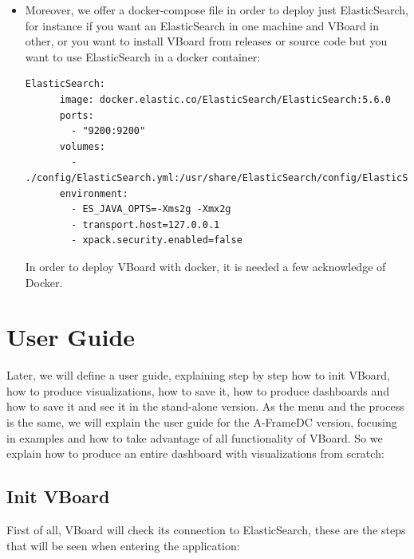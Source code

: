 \documentclass[a4paper, 12pt]{book}
\begin{document}
\begin{itemize}
    \item Moreover, we offer a docker-compose file in order to deploy just ElasticSearch, for instance if you want an ElasticSearch in one machine and VBoard in other, or you want to install VBoard from releases or source code but you want to use ElasticSearch in a docker container:
    \begin{lstlisting}[frame=single]
    ElasticSearch:
      image: docker.elastic.co/ElasticSearch/ElasticSearch:5.6.0
      ports:
        - "9200:9200"
      volumes:
        - ./config/ElasticSearch.yml:/usr/share/ElasticSearch/config/ElasticSearch.yml:ro
      environment:
        - ES_JAVA_OPTS=-Xms2g -Xmx2g
        - transport.host=127.0.0.1
        - xpack.security.enabled=false
    \end{lstlisting}
    
In order to deploy VBoard with docker, it is needed a few acknowledge of Docker.




\end{itemize}

\section{User Guide}

Later, we will define a user guide, explaining step by step how to init VBoard, how to produce visualizations, how to save it, how to produce dashboards and how to save it and see it in the stand-alone version.  As the menu and the process is the same, we will explain the user guide for the A-FrameDC version, focusing in examples and how to take advantage of all functionality of VBoard. So we explain how to produce an entire dashboard with visualizations from scratch:

\subsection{Init VBoard}

First of all, VBoard will check its connection to ElasticSearch, these are the steps that will be seen when entering the application:
\end{document}
